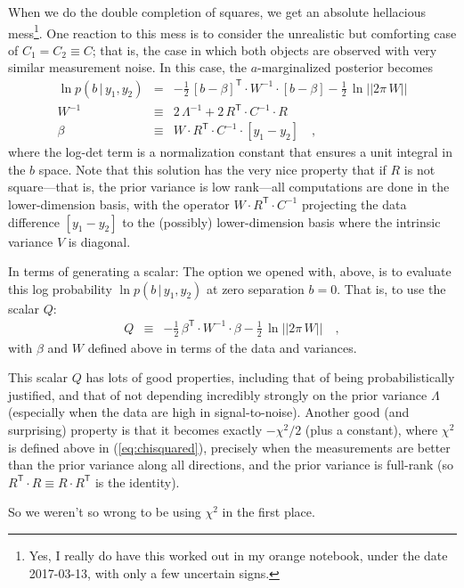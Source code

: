 \documentclass[12pt,letterpaper]{article}
\newcommand{\transpose}[1]{{#1}^{\mathsf{T}}}
\newcommand{\inverse}[1]{{#1}^{-1}}
\renewcommand{\det}[1]{||{#1}||}
\newcommand{\given}{\,|\,}
\begin{document}
When we do the double completion of squares, we get an absolute
hellacious mess\footnote{Yes, I really do have this worked out in my
  orange notebook, under the date 2017-03-13, with only a few
  uncertain signs.}.
One reaction to this mess is to consider the
unrealistic but comforting case of $C_1=C_2\equiv C$; that is, the case in
which both objects are observed with very similar measurement noise.
In this case, the $a$-marginalized posterior becomes
\begin{eqnarray}
\ln p(b\given y_1,y_2) &=&
  -\frac{1}{2}\,\transpose{[b-\beta]}\cdot\inverse{W}\cdot [b-\beta]
  -\frac{1}{2}\,\ln\det{2\pi\,W} \\
\inverse{W} &\equiv&
  2\,\inverse{\Lambda} + 2\,\transpose{R}\cdot\inverse{C}\cdot R \\
\beta &\equiv&
  W\cdot\transpose{R}\cdot\inverse{C}\cdot [y_1 - y_2]
\quad ,
\end{eqnarray}
where the log-det term is a normalization constant that ensures a unit
integral in the $b$ space. Note that this solution has the very nice
property that if $R$ is not square---that is, the prior variance is
low rank---all computations are done in the lower-dimension basis,
with the operator $W\cdot\transpose{R}\cdot\inverse{C}$ projecting the
data difference $[y_1-y_2]$ to the (possibly) lower-dimension basis
where the intrinsic variance $V$ is diagonal.

In terms of generating a scalar: The option we opened with, above, is
to evaluate this log probability $\ln p(b\given y_1,y_2)$ at zero
separation $b=0$. That is, to use the scalar $Q$:
\begin{eqnarray}
Q &\equiv&
  -\frac{1}{2}\,\transpose{\beta}\cdot\inverse{W}\cdot\beta
  -\frac{1}{2}\,\ln\det{2\pi\,W} \quad ,
\end{eqnarray}
with $\beta$ and $W$ defined above in terms of the data and variances.

This scalar $Q$ has lots of good properties, including that of being
probabilistically justified, and that of not depending incredibly
strongly on the prior variance $\Lambda$ (especially when the data are
high in signal-to-noise). Another good (and surprising) property is
that it becomes exactly $-\chi^2/2$ (plus a constant), where $\chi^2$
is defined above in (\ref{eq:chisquared}), precisely when the
measurements are better than the prior variance along all directions,
and the prior variance is full-rank (so $\transpose{R}\cdot R\equiv R\cdot\transpose{R}$ is the
identity).

So we weren't so wrong to be using $\chi^2$ in the first place.
\end{document}
